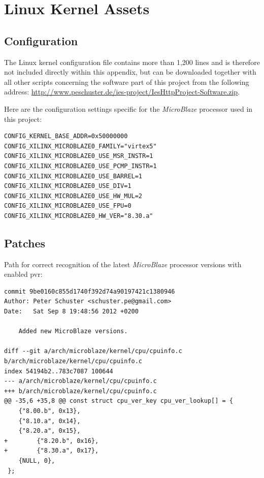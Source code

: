 \section{Linux Kernel Assets}

\subsection{Configuration}

The Linux kernel configuration file contains more than 1,200 lines and is therefore not included directly within this appendix, but can be downloaded together with all other scripts concerning the software part of this project from the following address: \url{http://www.peschuster.de/ies-project/IesHttpProject-Software.zip}.

Here are the configuration settings specific for the \textit{MicroBlaze} processor used in this project:

\begin{verbatim}
CONFIG_KERNEL_BASE_ADDR=0x50000000
CONFIG_XILINX_MICROBLAZE0_FAMILY="virtex5"
CONFIG_XILINX_MICROBLAZE0_USE_MSR_INSTR=1
CONFIG_XILINX_MICROBLAZE0_USE_PCMP_INSTR=1
CONFIG_XILINX_MICROBLAZE0_USE_BARREL=1
CONFIG_XILINX_MICROBLAZE0_USE_DIV=1
CONFIG_XILINX_MICROBLAZE0_USE_HW_MUL=2
CONFIG_XILINX_MICROBLAZE0_USE_FPU=0
CONFIG_XILINX_MICROBLAZE0_HW_VER="8.30.a"
\end{verbatim} 

\subsection{Patches}
\label{subsec:pvr_patch}

Path for correct recognition of the latest \textit{MicroBlaze} processor versions with enabled \gls{pvr}:

\begin{verbatim}
commit 9be0160c855d1740f392d74a90197421c1380946
Author: Peter Schuster <schuster.pe@gmail.com>
Date:   Sat Sep 8 19:48:56 2012 +0200

    Added new MicroBlaze versions.

diff --git a/arch/microblaze/kernel/cpu/cpuinfo.c b/arch/microblaze/kernel/cpu/cpuinfo.c
index 54194b2..783c7087 100644
--- a/arch/microblaze/kernel/cpu/cpuinfo.c
+++ b/arch/microblaze/kernel/cpu/cpuinfo.c
@@ -35,6 +35,8 @@ const struct cpu_ver_key cpu_ver_lookup[] = {
 	{"8.00.b", 0x13},
 	{"8.10.a", 0x14},
 	{"8.20.a", 0x15},
+        {"8.20.b", 0x16},
+        {"8.30.a", 0x17},
 	{NULL, 0},
 };
\end{verbatim}

